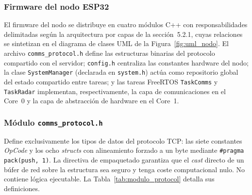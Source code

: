 \subsubsection*{Firmware del nodo ESP32}


El firmware del nodo se distribuye en cuatro módulos C++ con responsabilidades delimitadas según la arquitectura por capas de la sección~5.2.1, cuyas relaciones se sintetizan en el diagrama de clases UML de la Figura~\ref{fig:uml_nodo}. El archivo \texttt{comms\_protocol.h} define las estructuras binarias del protocolo compartido con el servidor; \texttt{config.h} centraliza las constantes hardware del nodo; la clase \texttt{SystemManager} (declarada en \texttt{system.h}) actúa como repositorio global del estado compartido entre tareas; y las tareas FreeRTOS \texttt{TaskComms} y \texttt{TaskRadar} implementan, respectivamente, la capa de comunicaciones en el Core~0 y la capa de abstracción de hardware en el Core~1.

\subsubsection*{Módulo \texttt{comms\_protocol.h}}

Define exclusivamente los tipos de datos del protocolo TCP: las siete constantes \textit{OpCode} y los ocho \textit{structs} con alineamiento forzado a un byte mediante \texttt{\#pragma pack(push,~1)}. La directiva de empaquetado garantiza que el \textit{cast} directo de un búfer de red sobre la estructura sea seguro y tenga coste computacional nulo. No contiene lógica ejecutable. La Tabla~\ref{tab:modulo_protocol} detalla sus definiciones.

